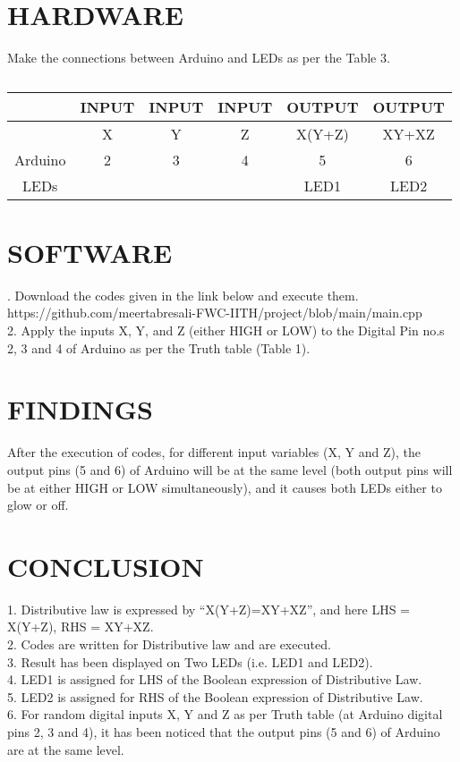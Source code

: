 \documentclass[conference]{IEEEtran}
\begin{document}
\section{HARDWARE}
Make the connections between Arduino and LEDs as per the Table 3.
\begin{table}[h]
\begin{tabular}{|c | c | c | c | c | c |} \hline
 & \textbf{INPUT} & \textbf{INPUT} & \textbf{INPUT} & \textbf{OUTPUT} & \textbf{OUTPUT} \\\hline
 & X & Y & Z & X(Y+Z) & XY+XZ \\ \hline
Arduino & 2 & 3 & 4 & 5 & 6 \\ 
LEDs &  &  &  & LED1 & LED2 \\ \hline
\end{tabular}
\caption{\label{tab:widgets}}
\end{table}

\section{SOFTWARE}
. Download the codes given in the link below and execute them.\\
https://github.com/meertabresali-FWC-IITH/project/blob/main/main.cpp \\
2. Apply the inputs X, Y, and Z (either HIGH or LOW) to the Digital Pin no.s 2, 3 and 4 of Arduino as per the Truth table (Table 1).
\section{FINDINGS}
After the execution of codes, for different input variables (X, Y and Z), the output pins (5 and 6) of Arduino will be at the same level (both output pins will be at either HIGH or LOW simultaneously), and it causes both LEDs either to glow or off.
\section{CONCLUSION}
1. Distributive law is expressed by “X(Y+Z)=XY+XZ”, and here LHS = X(Y+Z), RHS = XY+XZ.\\
2. Codes are written for Distributive law and are executed.\\
3. Result has been displayed on Two LEDs (i.e. LED1 and LED2). \\
4. LED1 is assigned for LHS of the Boolean expression of Distributive Law. \\
5. LED2 is assigned for RHS of the Boolean expression of Distributive Law. \\
6. For random digital inputs X, Y and Z as per Truth table (at Arduino digital pins 2, 3 and 4), it has been noticed that the output pins (5 and 6) of Arduino are at the same level.
\end{document}
